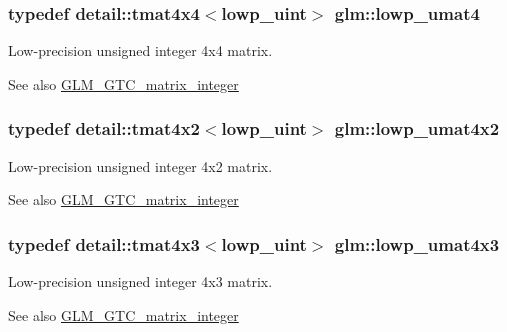 \subsubsection[{lowp\+\_\+umat4}]{\setlength{\rightskip}{0pt plus 5cm}typedef detail\+::tmat4x4$<$lowp\+\_\+uint$>$ {\bf glm\+::lowp\+\_\+umat4}}\label{group__gtc__matrix__integer_ga8c3fe5b40073668893a32bd07b7a64a1}
Low-\/precision unsigned integer 4x4 matrix. \begin{DoxySeeAlso}{See also}
\hyperlink{group__gtc__matrix__integer}{G\+L\+M\+\_\+\+G\+T\+C\+\_\+matrix\+\_\+integer} 
\end{DoxySeeAlso}
\hypertarget{group__gtc__matrix__integer_gacc7fd3996cf8cb661099c95a0363d051}{}
\subsubsection[{lowp\+\_\+umat4x2}]{\setlength{\rightskip}{0pt plus 5cm}typedef detail\+::tmat4x2$<$lowp\+\_\+uint$>$ {\bf glm\+::lowp\+\_\+umat4x2}}\label{group__gtc__matrix__integer_gacc7fd3996cf8cb661099c95a0363d051}
Low-\/precision unsigned integer 4x2 matrix. \begin{DoxySeeAlso}{See also}
\hyperlink{group__gtc__matrix__integer}{G\+L\+M\+\_\+\+G\+T\+C\+\_\+matrix\+\_\+integer} 
\end{DoxySeeAlso}
\hypertarget{group__gtc__matrix__integer_ga37c5f105dd98823c07c39710f57260fe}{}
\subsubsection[{lowp\+\_\+umat4x3}]{\setlength{\rightskip}{0pt plus 5cm}typedef detail\+::tmat4x3$<$lowp\+\_\+uint$>$ {\bf glm\+::lowp\+\_\+umat4x3}}\label{group__gtc__matrix__integer_ga37c5f105dd98823c07c39710f57260fe}
Low-\/precision unsigned integer 4x3 matrix. \begin{DoxySeeAlso}{See also}
\hyperlink{group__gtc__matrix__integer}{G\+L\+M\+\_\+\+G\+T\+C\+\_\+matrix\+\_\+integer} 
\end{DoxySeeAlso}
\hypertarget{group__gtc__matrix__integer_ga38b31bccefd74f6a9e9272cac084df34}{}
